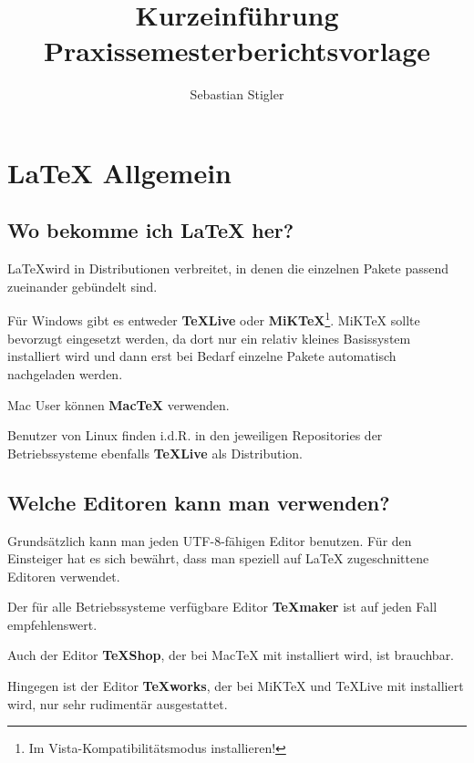 \documentclass[pdftex,a4paper]{scrartcl}
\title{Kurzeinführung Praxissemesterberichtsvorlage}
\author{Sebastian Stigler}
\begin{document}
\maketitle

\tableofcontents

\section{\LaTeX{} Allgemein}

\subsection{Wo bekomme ich \LaTeX{} her?}
\LaTeX wird in Distributionen verbreitet, in denen die einzelnen Pakete passend zueinander gebündelt sind.

Für Windows gibt es entweder \textbf{\TeX{}Live}\autocite{tug:texlive} oder \textbf{MiK\TeX}\footnote{Im Vista-Kompatibilitätsmodus installieren!}\autocite{schenk:miktex}. 
MiK\TeX{} sollte bevorzugt eingesetzt werden, da dort nur ein relativ kleines Basissystem installiert wird und dann erst bei Bedarf einzelne Pakete automatisch nachgeladen werden.

Mac User können \textbf{Mac\TeX}\autocite{tug:mactex} verwenden.

Benutzer von Linux finden i.d.R. in den jeweiligen Repositories der Betriebssysteme ebenfalls \textbf{\TeX{}Live}\autocite{tug:texlive} als Distribution.

\subsection{Welche Editoren kann man verwenden?}

Grundsätzlich kann man jeden UTF-8-fähigen Editor benutzen. Für den Einsteiger hat es sich bewährt, dass man speziell auf \LaTeX{} zugeschnittene Editoren verwendet.

Der für alle Betriebssysteme verfügbare Editor \textbf{\TeX{}maker}\autocite{brachet:texmaker} ist auf jeden Fall empfehlenswert.

Auch der Editor \textbf{\TeX{}Shop}, der bei Mac\TeX{} mit installiert wird, ist brauchbar.

Hingegen ist der Editor \textbf{\TeX{}works}, der bei MiK\TeX{} und \TeX{}Live mit installiert wird, nur sehr rudimentär ausgestattet. 

\end{document}
